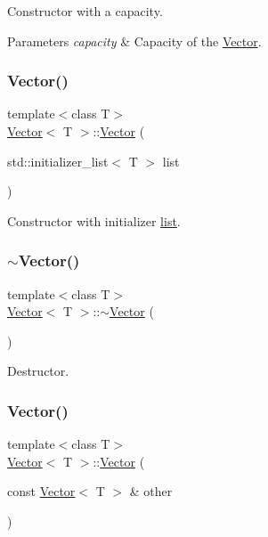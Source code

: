 Constructor with a capacity. 
\begin{DoxyParams}{Parameters}
{\em capacity} & Capacity of the \hyperlink{classVector}{Vector}. \\
\hline
\end{DoxyParams}
\mbox{\label{classVector_a0dba46f864a228e2abde110db8a4e4d8}} 
\subsubsection{\texorpdfstring{Vector()}{Vector()}\hspace{0.1cm}{\footnotesize\ttfamily [8/10]}}
{\footnotesize\ttfamily template$<$class T$>$ \\
\hyperlink{classVector}{Vector}$<$ T $>$\+::\hyperlink{classVector}{Vector} (\begin{DoxyParamCaption}\item[{std\+::initializer\+\_\+list$<$ T $>$}]{list }\end{DoxyParamCaption})\hspace{0.3cm}{\ttfamily [inline]}}

Constructor with initializer \hyperlink{protocollist-p}{list}. \mbox{\label{classVector_afd524fac19e6d3d69db5198ffe2952b0}} 
\subsubsection{\texorpdfstring{$\sim$\+Vector()}{~Vector()}\hspace{0.1cm}{\footnotesize\ttfamily [2/2]}}
{\footnotesize\ttfamily template$<$class T$>$ \\
\hyperlink{classVector}{Vector}$<$ T $>$\+::$\sim$\hyperlink{classVector}{Vector} (\begin{DoxyParamCaption}{ }\end{DoxyParamCaption})\hspace{0.3cm}{\ttfamily [inline]}}

Destructor. \mbox{\label{classVector_ad0ed347210040680329535d7e4d16ae1}} 
\subsubsection{\texorpdfstring{Vector()}{Vector()}\hspace{0.1cm}{\footnotesize\ttfamily [9/10]}}
{\footnotesize\ttfamily template$<$class T$>$ \\
\hyperlink{classVector}{Vector}$<$ T $>$\+::\hyperlink{classVector}{Vector} (\begin{DoxyParamCaption}\item[{const \hyperlink{classVector}{Vector}$<$ T $>$ \&}]{other }\end{DoxyParamCaption})\hspace{0.3cm}{\ttfamily [inline]}}

